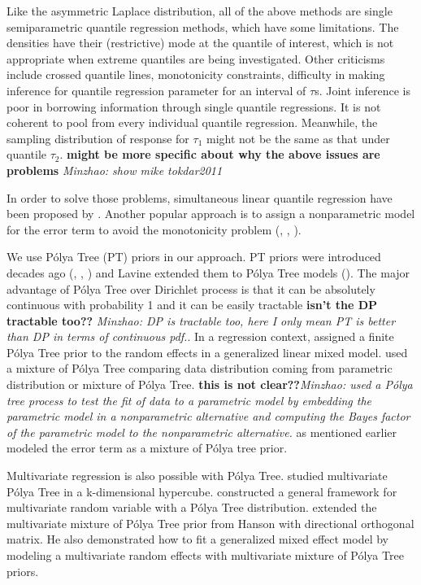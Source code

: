 \documentclass[12pt]{article}
\newcommand{\polya}{P\'{o}lya}
\begin{document}
Like the asymmetric Laplace distribution, all of the above methods are
single semiparametric quantile regression methods, which have some
limitations. The densities have their (restrictive) mode at the
quantile of interest, which is not appropriate when extreme quantiles
are being investigated. Other criticisms include crossed quantile
lines, monotonicity constraints, difficulty in making inference for
quantile regression parameter for an interval of $\tau$s. Joint
inference is poor in borrowing information through single quantile
regressions. It is not coherent to pool from every individual quantile
regression. Meanwhile, the sampling distribution of response for
$\tau_1$ might not be the same as that under quantile $\tau_2$. {\bf
  might be more specific about why the above issues are problems} {\it
  Minzhao: show mike tokdar2011}

In order to solve those problems, simultaneous linear quantile
regression have been proposed by \citep{tokdar2011}.  Another popular
approach is to assign a nonparametric model for the error term to
avoid the monotonicity problem (\citep{scaccia2003},
\citep{geweke2007}, \citep{taddy2010}).

We use \polya{} Tree (PT) priors in our approach. PT priors were
introduced decades ago (\citep{freedman1963}, \citep{fabius1964},
\citep{ferguson1974}) and Lavine extended them to \polya{} Tree models
(\citep{lavine1992, lavine1994}). The major advantage of \polya{} Tree
over Dirichlet process is that it can be absolutely continuous with
probability 1 and it can be easily tractable {\bf isn't the DP
  tractable too??} {\it Minzhao: DP is tractable too, here I only mean
  PT is better than DP in terms of continuous pdf.}. In a regression
context, \citep{walker1997, walker1999} assigned a finite \polya{}
Tree prior to the random effects in a generalized linear mixed
model. \citep{berger2001} used a mixture of \polya{} Tree comparing
data distribution coming from parametric distribution or mixture of
\polya{} Tree. {\bf this is not clear??}{\it Minzhao: used a \polya{}
  tree process to test the fit of data to a parametric model by
  embedding the parametric model in a nonparametric alternative and
  computing the Bayes factor of the parametric model to the
  nonparametric alternative.}  \citep{hanson2002} as mentioned earlier
modeled the error term as a mixture of \polya{} tree prior.

Multivariate regression is also possible with \polya{}
Tree. \citep{paddock1999, paddock2002} studied multivariate \polya{}
Tree in a k-dimensional hypercube. \citep{hanson2006} constructed a
general framework for multivariate random variable with a \polya{}
Tree distribution. \citep{jara2009} extended the multivariate mixture
of \polya{} Tree prior from Hanson with directional orthogonal matrix.
He also demonstrated how to fit a generalized mixed effect model by
modeling a multivariate random effects with multivariate mixture of
\polya{} Tree priors.
\end{document}
